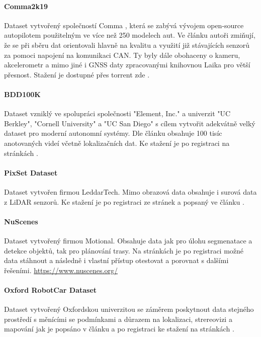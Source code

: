 \documentclass[czech, bc, kky, he, iso690numb]{fasthesis}
\begin{document}
  			\paragraph{Comma2k19}
  				Dataset vytvořený společností Comma \cite{Comma}, která se zabývá vývojem open-source autopilotem použitelným ve více než 250 modelech aut. Ve článku \cite{dataset_comma2k19_paper} autoři zmiňují, že se při sběru dat orientovali hlavně na kvalitu a využití již stávajících senzorů za pomoci napojení na komunikaci CAN. Ty byly dále obohaceny o kameru, akcelerometr a mimo jiné i GNSS daty zpracovanými knihovnou Laika \cite{Laika} pro větší přesnost. Stažení je dostupné přes torrent zde \cite{dataset_comma2k19_github, dataset_comma2k19_download}.
  			\paragraph{BDD100K}
  				Dataset vzniklý ve spolupráci společnosti "Element, Inc." a univerzit "UC Berkley", "Cornell University" a "UC San Diego" s cílem vytvořit adekvátně velký dataset pro moderní autonomní systémy. Dle článku \cite{dataset_bdd100k_paper} obsahuje 100 tisíc anotovaných videí včetně lokalizačních dat. Ke stažení je po registraci na stránkách \cite{dataset_bdd100k}.
  			\paragraph{PixSet Dataset}
  				Dataset vytvořen firmou LeddarTech. Mimo obrazová data obsahuje i surová data z LiDAR senzorů. Ke stažení je po registraci ze stránek \cite{dataset_pixset} a popsaný ve článku \cite{dataset_pixset_paper}.
  			\paragraph{NuScenes}
  				Dataset vytvořený firmou Motional. Obsahuje data jak pro úlohu segmenatace a detekce objektů, tak pro plánování trasy. Na stránkách \cite{dataset_nuscenes} je po registraci možné data stáhnout a následně i vlastní přístup otestovat a porovnat s dalšími řešeními.
  				\href{https://www.nuscenes.org/}{https://www.nuscenes.org/}
  			\paragraph{Oxford RobotCar Dataset}
  				Dataset vytvořený Oxfordskou univerzitou se záměrem poskytnout data stejného prostředí s měnícími se podmínkami a důrazem na lokalizaci, strereovizi a mapování jak je popsáno v článku \cite{dataset_RobotCarDataset_paper} a po registraci ke stažení na stránkách \cite{dataset_RobotCarDataset}.
\end{document}

